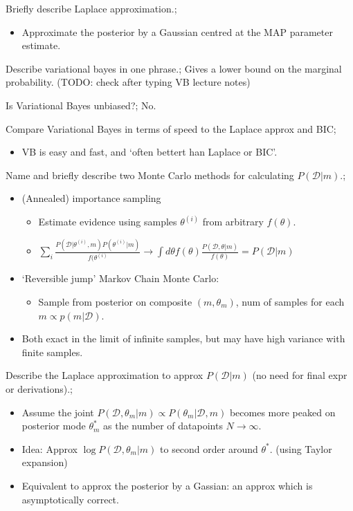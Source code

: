 \documentclass{article}
\begin{document}
Briefly describe Laplace approximation.; \begin{itemize}
    \item Approximate the posterior by a Gaussian centred at the MAP parameter estimate.
\end{itemize}

Describe variational bayes in one phrase.; Gives a lower bound on the marginal probability. (TODO: check after typing VB lecture notes)

Is Variational Bayes unbiased?; No.

Compare Variational Bayes in terms of speed to the Laplace approx and BIC; \begin{itemize}
    \item VB is easy and fast, and `often bettert han Laplace or BIC'.
\end{itemize}

Name and briefly describe two Monte Carlo methods for calculating $P(\mathcal{D}|m)$.; \begin{itemize}
    \item (Annealed) importance sampling \begin{itemize}
        \item Estimate evidence using samples $\theta^{(i)}$ from arbitrary $f(\theta)$.
        \item $\sum_i \frac{P(\mathcal{D}|\theta^{(i)}, m)P(\theta^{(i)}|m)}{f(\theta^{(i)}}\rightarrow \int d\theta f(\theta)\frac{P(\mathcal{D},\theta|m)}{f(\theta)}=P(\mathcal{D}|m)$
    \end{itemize}
    \item `Reversible jump' Markov Chain Monte Carlo: 
    \begin{itemize}
        \item Sample from posterior on composite $(m, \theta_m)$, num of samples for each $m\propto p(m|\mathcal{D})$.
    \end{itemize}
    \item Both exact in the limit of infinite samples, but may have high variance with finite samples.
\end{itemize}

Describe the Laplace approximation to approx $P(\mathcal{D}|m)$ (no need for final expr or derivations).; \begin{itemize}
    \item Assume the joint $P(\mathcal{D},\theta_m|m)\propto P(\theta_m|\mathcal{D},m)$ becomes more peaked on posterior mode $\theta^*_m$ as the number of datapoints $N\rightarrow\infty$.
    \item Idea: Approx $\log P(\mathcal{D},\theta_m|m)$ to second order around $\theta^*$. (using Taylor expansion)
    \item Equivalent to approx the posterior by a Gassian: an approx which is asymptotically correct.
\end{itemize}
\end{document}
